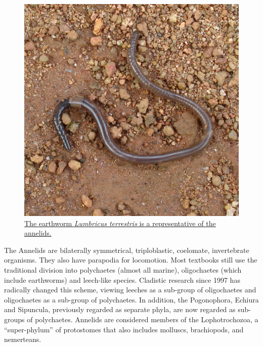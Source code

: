 \begin{figure}

{\centering \includegraphics[width=0.7\linewidth]{./figures/animals/Earthworm} 

}

\caption{\href{https://commons.wikimedia.org/wiki/File:Nerr0328.jpg}{The earthworm \emph{Lumbricus terrestris} is a representative of the annelids.}}\label{fig:annelidrep}
\end{figure}

The Annelids are bilaterally symmetrical, triploblastic, coelomate, invertebrate organisms. They also have parapodia for locomotion. Most textbooks still use the traditional division into polychaetes (almost all marine), oligochaetes (which include earthworms) and leech-like species. Cladistic research since 1997 has radically changed this scheme, viewing leeches as a sub-group of oligochaetes and oligochaetes as a sub-group of polychaetes. In addition, the Pogonophora, Echiura and Sipuncula, previously regarded as separate phyla, are now regarded as sub-groups of polychaetes. Annelids are considered members of the Lophotrochozoa, a ``super-phylum'' of protostomes that also includes molluscs, brachiopods, and nemerteans.



